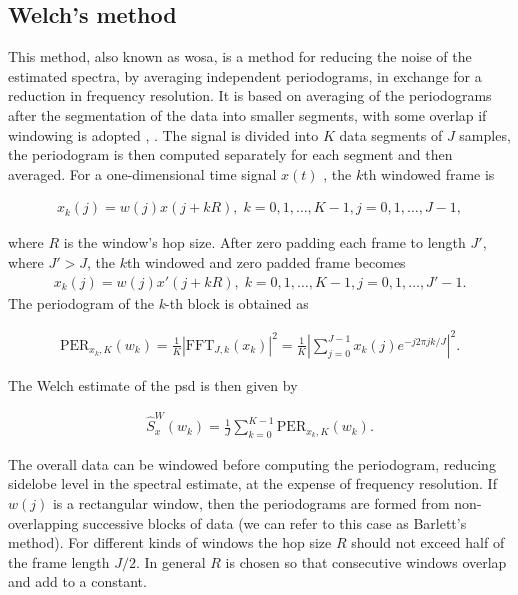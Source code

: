 	
	\subsection{Welch's method}
	
	This method, also known as \gls{wosa}, is a method for reducing the noise of the estimated spectra, by averaging independent periodograms, in exchange for a reduction in frequency resolution.
	It is based on averaging of the periodograms after the segmentation of the data into smaller segments, with some overlap if windowing is adopted \cite{Welch_period}, \cite{Spagnolini_ch14}.
	The signal is divided into $K$ data segments of $J$ samples, the periodogram is then computed separately for each segment and then averaged.
	For a one-dimensional time signal $x(t)$ \cite{SASPWEB2011}, the $k$th windowed frame is
	
	\begin{align}
		x_k(j) = w(j)x(j + kR), \; k=0,1,\ldots, K-1, j=0,1,\ldots, J-1,
	\end{align}
	
	where $R$ is the window's hop size.
	After zero padding each frame to length $J'$, where $J' > J$, the $k$th windowed and zero padded frame becomes
		\begin{align}
		x_k(j) = w(j)x'(j + kR), \; k=0,1,\ldots, K-1, j=0,1,\ldots, J'-1.
	\end{align}
	The periodogram of the \textit{k}-th block is obtained as
	
	\begin{align}
		\text{PER}_{x_k,K}(w_k) = \frac{1}{K} |\text{FFT}_{J,k}(x_k)|^2 = \frac{1}{K}\left|\sum_{j=0}^{J-1}x_k(j)e^{-j2\pi jk/J}\right|^2.
	\end{align}
	
	The Welch estimate of the \gls{psd} is then given by
	
	\begin{align}
		\hat{S}^W_x(w_k) = \frac{1}{J}\sum_{k=0}^{K-1}\text{PER}_{x_k,K}(w_k).
	\end{align}
	
	The overall data can be windowed before computing the periodogram, reducing sidelobe level in the spectral estimate, at the expense of frequency resolution. If $w(j)$ is a rectangular window, then the periodograms are formed from non-overlapping successive blocks of data (we can refer to this case as Barlett's method). For different kinds of windows the hop size $R$ should not exceed half of the frame length $J/2$. In general $R$ is chosen so that consecutive windows overlap and add to a constant.
	
